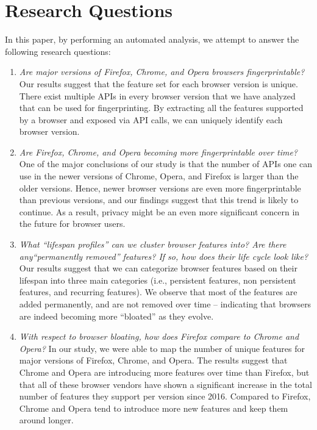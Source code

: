 \section{Research Questions}
\label{sec:research}

In this paper, by performing an automated analysis, we attempt to
answer the following research questions:

\begin{enumerate}
  
\item {\em Are major versions of Firefox, Chrome, and Opera browsers
  fingerprintable?} Our results suggest that the feature set for each
  browser version is unique. There exist multiple
  APIs in every browser version that we have analyzed that can be used
  for fingerprinting. By extracting all the features supported by a
  browser and exposed via API calls, we can uniquely identify each
  browser version.

\item {\em Are Firefox, Chrome, and Opera becoming more
  fingerprintable over time?} One of the major conclusions of our
  study is that the number of APIs one can use in the newer versions
  of Chrome, Opera, and Firefox is larger than the older versions. Hence, newer
  browser versions are even more fingerprintable than previous
  versions, and our findings suggest that this trend is likely to
  continue. As a result, privacy might be an even more significant
  concern in the future for browser users.
    
\item {\em What ``lifespan profiles'' can we cluster browser features
    into? Are there any``permanently removed'' features? If so, how
    does their life cycle look like?} Our results suggest that we can
  categorize browser features based on their lifespan into three main
  categories (i.e., persistent features, non persistent features, and
  recurring features). We observe that most of the features are added
  permanently, and are not removed over time -- indicating that
  browsers are indeed becoming more ``bloated'' as they evolve.

\item {\em With respect to browser bloating, how does Firefox compare
    to Chrome and Opera?} In our study, we were able to map the number of unique
  features for major versions of Firefox, Chrome, and Opera. The results
  suggest that Chrome and Opera are introducing more features over time than
  Firefox, but that all of these browser vendors have shown a significant
  increase in the total number of features they support per version
  since 2016. Compared to Firefox, Chrome and Opera tend to introduce more new
  features and keep them around longer.
 

\end{enumerate}
